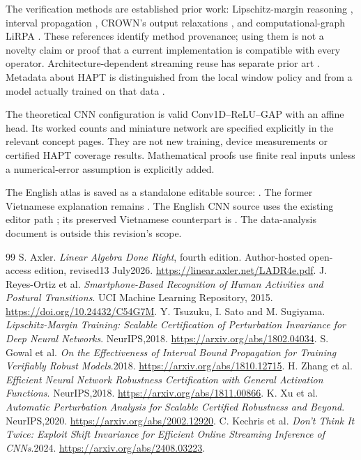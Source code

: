 The verification methods are established prior work: Lipschitz-margin
reasoning \cite{lmt}, interval propagation \cite{ibp}, CROWN's output
relaxations \cite{crown}, and computational-graph LiRPA \cite{lirpa}.
These references identify method provenance; using them is not a novelty
claim or proof that a current implementation is compatible with every
operator. Architecture-dependent streaming reuse has separate prior art
\cite{streaminnc}. Metadata about HAPT is distinguished from the local
window policy and from a model actually trained on that data \cite{hapt}.

The theoretical CNN configuration is valid Conv1D--ReLU--GAP with an affine
head. Its worked counts and miniature network are specified explicitly in
the relevant concept pages. They are not new training, device measurements
or certified HAPT coverage results. Mathematical proofs use finite real
inputs unless a numerical-error assumption is explicitly added.

The English atlas is saved as a standalone editable source:
. The former Vietnamese explanation
remains . The English CNN source uses
the existing editor path ; its preserved
Vietnamese counterpart is .
The data-analysis document is outside this revision's scope.

\begin{thebibliography}{99}
 S. Axler. \emph{Linear Algebra Done Right}, fourth edition.
Author-hosted open-access edition, revised13 July2026.
\url{https://linear.axler.net/LADR4e.pdf}.
 J. Reyes-Ortiz et al. \emph{Smartphone-Based Recognition of
Human Activities and Postural Transitions}. UCI Machine Learning Repository,
2015. \url{https://doi.org/10.24432/C54G7M}.
 Y. Tsuzuku, I. Sato and M. Sugiyama. \emph{Lipschitz-Margin
Training: Scalable Certification of Perturbation Invariance for Deep Neural
Networks}. NeurIPS,2018. \url{https://arxiv.org/abs/1802.04034}.
 S. Gowal et al. \emph{On the Effectiveness of Interval Bound
Propagation for Training Verifiably Robust Models}.2018.
\url{https://arxiv.org/abs/1810.12715}.
 H. Zhang et al. \emph{Efficient Neural Network Robustness
Certification with General Activation Functions}. NeurIPS,2018.
\url{https://arxiv.org/abs/1811.00866}.
 K. Xu et al. \emph{Automatic Perturbation Analysis for Scalable
Certified Robustness and Beyond}. NeurIPS,2020.
\url{https://arxiv.org/abs/2002.12920}.
 C. Kechris et al. \emph{Don't Think It Twice: Exploit Shift
Invariance for Efficient Online Streaming Inference of CNNs}.2024.
\url{https://arxiv.org/abs/2408.03223}.
\end{thebibliography}


